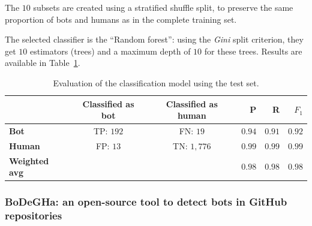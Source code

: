 \documentclass[a4paper, 12pt]{book}
\begin{document}
The $10$ subsets are created using a stratified shuffle split, to preserve the same proportion of bots and humans as in the complete training set.

The selected classifier is the ``Random forest'': using the \textit{Gini} split criterion, they get $10$ estimators (trees) and a maximum depth of $10$ for these trees. Results are available in Table~\ref{table:golzadeh-table-results}.
\smallskip


\begin{table}[htb]  %
 \renewcommand{\arraystretch}{1.2}  %
 \begin{center}
  \begin{tabular}{  l  c  c  r  r  r }
    \toprule    %
      & \textbf{Classified as bot} & \textbf{Classified as human} & \textbf{P} & \textbf{R} & \textbf{$F_{1}$} \\ 
      \midrule %
    \textbf{Bot} & TP: $192$ & FN: $19$ & $0.94$ & $0.91$ & $0.92$ \\ %
    \textbf{Human} & FP: $13$ & TN: $1,776$ & $0.99$ & $0.99$ & $0.99$ \\ %
    \textbf{Weighted avg} &  &  & $0.98$ & $0.98$ & $0.98$ \\
    \bottomrule     %
  \end{tabular}
  \caption{Evaluation of the classification model using the test set.}
  \label{table:golzadeh-table-results}
 \end{center}
\end{table}

\subsubsection{BoDeGHa: an open-source tool to detect bots in GitHub repositories}
\label{sssec:golzadeh-tool}
\end{document}
